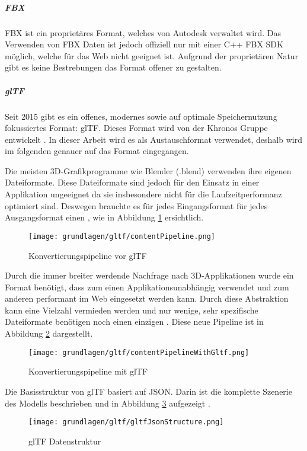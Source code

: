 \subparagraph{FBX}
FBX ist ein proprietäres Format, welches von Autodesk verwaltet wird. Das Verwenden von FBX Daten ist jedoch offiziell nur mit einer C++ FBX SDK möglich, welche für das Web nicht geeignet ist. Aufgrund der proprietären Natur gibt es keine Bestrebungen das Format offener zu gestalten.

\subparagraph{glTF}
Seit 2015 gibt es ein offenes, modernes sowie auf optimale Speichernutzung fokussiertes Format: glTF. Dieses Format wird von der Khronos Gruppe entwickelt \cite{gltf1Spec}. In dieser Arbeit wird es als Austauschformat verwendet, deshalb wird im folgenden genauer auf das Format eingegangen.

Die meisten 3D-Grafikprogramme wie Blender (.blend) verwenden ihre eigenen Dateiformate. Diese Dateiformate sind jedoch für den Einsatz in einer Applikation ungeeignet da sie insbesondere nicht für die Laufzeitperformanz optimiert sind. Deswegen brauchte es für jedes Eingangsformat für jedes Ausgangsformat einen , wie in Abbildung \ref{fig:contentPipelineWithoutGltf} ersichtlich.

\begin{figure}[H]
  \centering
  \texttt{[image: grundlagen/gltf/contentPipeline.png]}
  \caption{Konvertierungspipeline vor glTF \cite{gltfTutorialIntro}}
  \label{fig:contentPipelineWithoutGltf}
\end{figure}

Durch die immer breiter werdende Nachfrage nach 3D-Applikationen wurde ein Format benötigt, dass zum einen Applikationsunabhängig verwendet und zum anderen performant im Web eingesetzt werden kann.
Durch diese Abstraktion kann eine Vielzahl  vermieden werden und nur wenige, sehr spezifische Dateiformate benötigen noch einen einzigen . Diese neue Pipeline ist in Abbildung \ref{fig:contentPipelineWithGltf} dargestellt. \cite{gltfTutorialIntro}
\begin{figure}[H]
  \centering
  \texttt{[image: grundlagen/gltf/contentPipelineWithGltf.png]}
  \caption{Konvertierungspipeline mit glTF \cite{gltfTutorialIntro}}
  \label{fig:contentPipelineWithGltf}
\end{figure}

Die Basisstruktur von glTF basiert auf JSON. Darin ist die komplette Szenerie des Modells beschrieben und in Abbildung \ref{fig:gltfDatastructure} aufgezeigt \cite{gltfTutorialStructure}.
\begin{figure}[H]
  \centering
  \texttt{[image: grundlagen/gltf/gltfJsonStructure.png]}
  \caption{glTF Datenstruktur \cite{gltfTutorialStructure}}
  \label{fig:gltfDatastructure}
\end{figure}

